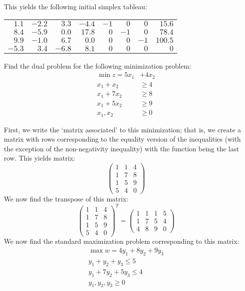 \documentclass[11pt,letterpaper]{article}
\begin{document}
This yields the following initial simplex tableau: \par
	\begin{table}[!ht]
	\centering
	\begin{tabular}{rrrrrrr|r}
	$1.1$ & $-2.2$ & $3.3$ & $-4.4$ & $-1$ & $0$ & $0$ & $15.6$ \\
	$8.4$ & $-5.9$ & $0.0$ & $17.8$ & $0$ & $-1$ & $0$ & $78.4$ \\
	$9.9$ & $-1.0$ & $6.7$ & $0.0$ & $0$ & $0$ & $-1$ & $100.5$ \\ \hline
	$-5.3$ & $3.4$ & $-6.8$ & $8.1$ & $0$ & $0$ & $0$ & $0$ 
	\end{tabular}
	\end{table} 



\newpage



 Find the dual problem for the following minimization problem:
	\[
	\begin{aligned}
	\min z= 5x_1 &+ 4x_2 \\
	x_1 + x_2 &\geq 4 \\
	x_1 + 7x_2 &\geq 8 \\
	x_1 + 5x_2 &\geq 9 \\
	x_1, x_2 &\geq 0 
	\end{aligned}
	\] \pspace

\sol First, we write the `matrix associated' to this minimization; that is, we create a matrix with rows corresponding to the equality version of the inequalities (with the exception of the non-negativity inequality) with the function being the last row. This yields matrix:
	\[
	\begin{pmatrix}
	1 & 1 & 4 \\
	1 & 7 & 8 \\
	1 & 5 & 9 \\
	5 & 4 & 0 
	\end{pmatrix}
	\]
We now find the transpose of this matrix: 
	\[
	\begin{pmatrix}
	1 & 1 & 4 \\
	1 & 7 & 8 \\
	1 & 5 & 9 \\
	5 & 4 & 0 
	\end{pmatrix}^T= 
	\begin{pmatrix}
	1 & 1 & 1 & 5 \\
	1 & 7 & 5 & 4 \\
	4 & 8 & 9 & 0 
	\end{pmatrix}
	\]
We now find the standard maximization problem corresponding to this matrix:
	\[
	\begin{aligned}
	\max w= 4y_1 + 8y_2 + 9y_3 \\
	y_1 + y_2 + y_3 \leq 5 \\
	y_1 + 7y_2 + 5y_3 \leq 4 \\
	y_1, y_2, y_3 \geq 0 
	\end{aligned}
	\]
\end{document}

